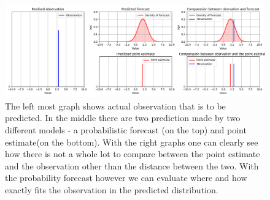 \documentclass[12pt,a4paper,twoside]{scrartcl}
\numberwithin{equation}{section}
\begin{document}
\begin{center}
  \begin{figure}[htbp]
    \label{fig:point-vs-dist}
    \centering
    \includegraphics[height=0.5\textwidth, width=1.0\textwidth]{figures/distribution_point.png}
    \caption[Point estimate and distribution forecast]{The left most graph shows actual observation that is to be predicted. In the middle there are two prediction made by two different models - a probabilistic forecast (on the top) and point estimate(on the bottom). With the right graphs one can clearly see how there is not a whole lot to compare between the point estimate and the observation other than the distance between the two. With the probability forecast however we can evaluate where and how exactly fits the observation in the predicted distribution.}
  \end{figure}
\end{center}
\end{document}
